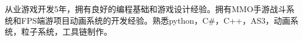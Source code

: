 


\cvself
{从业游戏开发5年，拥有良好的编程基础和游戏设计经验。拥有MMO手游战斗系统和FPS端游项目动画系统的开发经验。熟悉python，C\#，C++，AS3，动画系统，粒子系统，工具链制作。}
